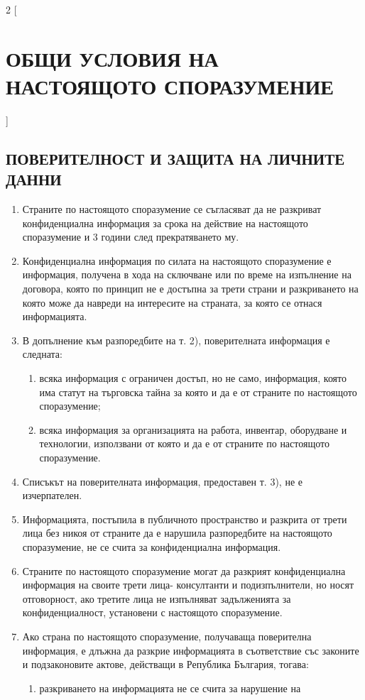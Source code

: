 \begin{multicols}{2} [\section{ОБЩИ УСЛОВИЯ НА НАСТОЯЩОТО
    СПОРАЗУМЕНИЕ}]
  \subsection{ПОВЕРИТЕЛНОСТ И ЗАЩИТА НА ЛИЧНИТЕ ДАННИ}
  \begin{enumerate}
  \item Страните по настоящото споразумение се съгласяват да не
    разкриват конфиденциална информация за срока на действие на
    настоящото споразумение и 3 години след прекратяването му.
  \item Конфиденциална информация по силата на настоящото споразумение
    е информация, получена в хода на сключване или по време на
    изпълнение на договора, която по принцип не е достъпна за трети
    страни и разкриването на която може да навреди на интересите на
    страната, за която се отнася информацията.
  \item В допълнение към разпоредбите на т. 2), поверителната
    информация е следната:
    \begin{enumerate}
    \item всяка информация с ограничен достъп, но не само, информация,
      която има статут на търговска тайна за която и да е от страните
      по настоящото споразумение;
    \item всяка информация за организацията на работа, инвентар,
      оборудване и технологии, използвани от която и да е от страните
      по настоящото споразумение.
    \end{enumerate}
  \item Списъкът на поверителната информация, предоставен т. 3), не е
    изчерпателен.
  \item Информацията, постъпила в публичното пространство и разкрита
    от трети лица без никоя от страните да е нарушила разпоредбите на
    настоящото споразумение, не се счита за конфиденциална информация.
  \item Страните по настоящото споразумение могат да разкрият
    конфиденциална информация на своите трети лица- консултанти и
    подизпълнители, но носят отговорност, ако третите лица не
    изпълняват задълженията за конфиденциалност, установени с
    настоящото споразумение.
  \item Ако страна по настоящото споразумение, получаваща поверителна
    информация, е длъжна да разкрие информацията в съответствие със
    законите и подзаконовите актове, действащи в Република България,
    тогава:
    \begin{enumerate}
    \item разкриването на информацията не се счита за нарушение на

\end{enumerate}
\end{enumerate}
\end{multicols}
